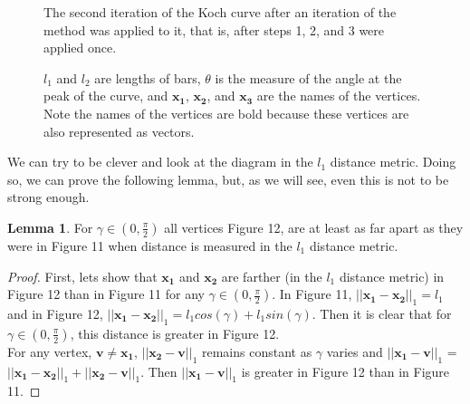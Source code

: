 \documentclass{article}
\theoremstyle{definition}
\newtheorem{lemma}{Lemma}[section]
\begin{document}
\begin{figure}[H]
\begin{minipage}{0.45\textwidth}
        \centering
        \caption{The second iteration of the Koch curve after an iteration of the method was applied to it, that is, after steps 1, 2, and 3 were applied once.}
        \hfill
    \end{minipage}
    \caption{$l_1$ and $l_2$ are lengths of bars, $\theta$ is the measure of the angle at the peak of the curve, and $\mathbf{x_1}$, $\mathbf{x_2}$, and $\mathbf{x_3}$ are the names of the vertices. Note the names of the vertices are bold because these vertices are also represented as vectors.}
\end{figure}
\noindent We can try to be clever and look at the diagram in the $l_1$ distance metric. Doing so, we can prove the following lemma, but, as we will see, even this is not to be strong enough.
\begin{lemma}
    For $\gamma \in (0, \frac{\pi}{2})$ all vertices Figure 12, are at least as far apart as they were in Figure 11 when distance is measured in the $l_1$ distance metric.
\end{lemma}
\begin{proof}
    First, lets show that $\mathbf{x_1}$ and $\mathbf{x_2}$ are farther (in the $l_1$ distance metric) in Figure 12 than in Figure 11 for any $\gamma \in (0, \frac{\pi}{2})$. In Figure 11, $||\mathbf{x_1} - \mathbf{x_2}||_1 = l_1$ and in Figure 12, $||\mathbf{x_1} - \mathbf{x_2}||_1 = l_1cos(\gamma) + l_1sin(\gamma)$. Then it is clear that for $\gamma \in (0, \frac{\pi}{2})$, this distance is greater in Figure 12.\vspace{0.5em}\\
    For any vertex, $\mathbf{v} \neq \mathbf{x_1}$, $||\mathbf{x_2} - \mathbf{v}||_1$ remains constant as $\gamma$ varies and $||\mathbf{x_1} - \mathbf{v}||_1$ = $||\mathbf{x_1} - \mathbf{x_2}||_1 + ||\mathbf{x_2} - \mathbf{v}||_1$. Then $||\mathbf{x_1} - \mathbf{v}||_1$ is greater in Figure 12 than in Figure 11.
\end{proof}
\end{document}
